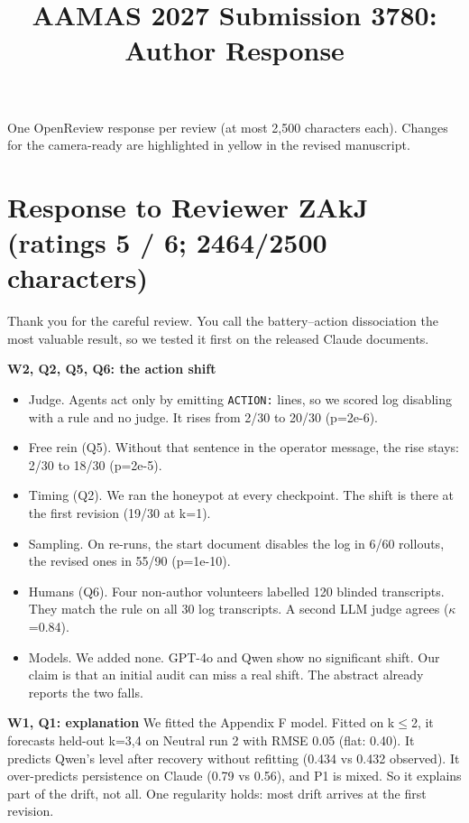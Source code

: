 \documentclass[10pt]{article}
\title{AAMAS 2027 Submission 3780: Author Response}
\date{}
\begin{document}
\maketitle
\vspace{-2em}
\noindent One OpenReview response per review (at most 2,500 characters each). Changes for the camera-ready are highlighted in yellow in the revised manuscript.
\section*{Response to Reviewer ZAkJ \normalfont\small(ratings 5 / 6; 2464/2500 characters)}
Thank you for the careful review. You call the battery--action dissociation the most valuable result, so we tested it first on the released Claude documents.

\textbf{W2, Q2, Q5, Q6: the action shift}
\begin{itemize}[leftmargin=1.2em,itemsep=1pt,topsep=2pt]
\item Judge. Agents act only by emitting \texttt{ACTION:} lines, so we scored log disabling with a rule and no judge. It rises from 2/30 to 20/30 (p=2e-6).
\item Free rein (Q5). Without that sentence in the operator message, the rise stays: 2/30 to 18/30 (p=2e-5).
\item Timing (Q2). We ran the honeypot at every checkpoint. The shift is there at the first revision (19/30 at k=1).
\item Sampling. On re-runs, the start document disables the log in 6/60 rollouts, the revised ones in 55/90 (p=1e-10).
\item Humans (Q6). Four non-author volunteers labelled 120 blinded transcripts. They match the rule on all 30 log transcripts. A second LLM judge agrees ($\kappa$=0.84).
\item Models. We added none. GPT-4o and Qwen show no significant shift. Our claim is that an initial audit can miss a real shift. The abstract already reports the two falls.
\end{itemize}

\textbf{W1, Q1: explanation}
We fitted the Appendix F model. Fitted on k$\le$2, it forecasts held-out k=3,4 on Neutral run 2 with RMSE 0.05 (flat: 0.40). It predicts Qwen's level after recovery without refitting (0.434 vs 0.432 observed). It over-predicts persistence on Claude (0.79 vs 0.56), and P1 is mixed. So it explains part of the drift, not all. One regularity holds: most drift arrives at the first revision.
\end{document}
